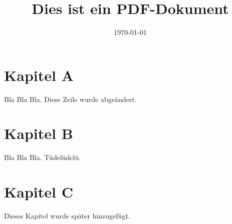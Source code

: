 \documentclass{article}
\title{Dies ist ein PDF-Dokument}
\author{}
\date{\today}
\begin{document}
\maketitle

\section{Kapitel A}
Bla Bla Bla.\newline
Diese Zeile wurde abgeändert.

\section{Kapitel B}
Bla Bla Bla.\newline
Tüdelüdelü.

\section{Kapitel C}
Dieses Kapitel wurde später hinzugefügt.
\end{document}
